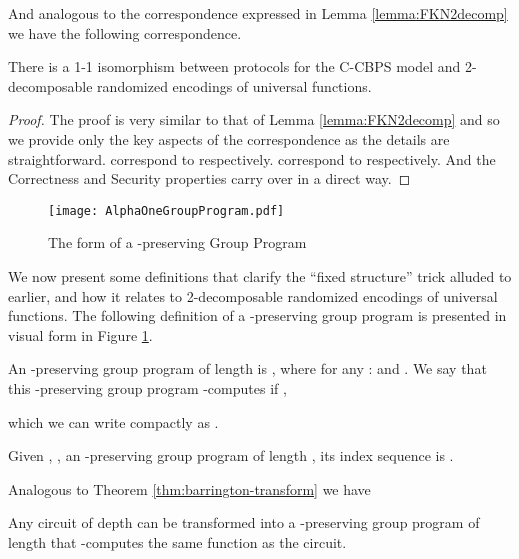 And   analogous    to   the   correspondence    expressed   in   Lemma
\ref{lemma:FKN2decomp} we have the following correspondence.

\begin{lemma}
\label{lemma:ccbps-2decompuniv}
There is a 1-1 isomorphism  between protocols for the C-CBPS model and
2-decomposable randomized encodings of universal functions.
\end{lemma}
\begin{proof}
The proof is very similar  to that of Lemma \ref{lemma:FKN2decomp} and
so  we provide  only  the key  aspects  of the  correspondence as  the
details  are  straightforward.    correspond  to  
respectively.         correspond   to
 respectively.  And the Correctness and Security
properties carry over in a direct way.
\end{proof} 

\begin{figure}
\centering
\texttt{[image: AlphaOneGroupProgram.pdf]}
\vspace{-.8in}
\caption{The form of a -preserving Group Program}
\label{fig:alphaone}
\end{figure}


We now  present some definitions that clarify  the ``fixed structure''
trick  alluded  to  earlier,  and  how it  relates  to  2-decomposable
randomized encodings of universal functions.  The following definition
of a -preserving group program is presented in visual form
in Figure \ref{fig:alphaone}.

\begin{definition}
  An  -preserving group  program of  length   is ,   where  for any :
   and .  We say that this
  -preserving      group     program     -computes
   if ,
  
  which  we can  write
compactly    as     .
\end{definition}

\begin{definition}
  Given  , , an
  -preserving  group  program  of  length  ,  its  index
  sequence is .
\end{definition}

Analogous   to   Theorem   \ref{thm:barrington-transform} we have

\begin{theorem} 
\label{thm:alpha-one-barrington-transform}
Any   circuit    of   depth      can   be    transformed   into   a
-preserving   group  program   of   length     that
-computes the same function as the circuit.
\end{theorem}

